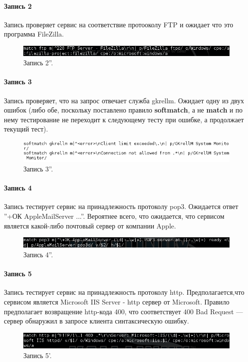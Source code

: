 \documentclass[a4paper, 14pt]{article}				%
\begin{document}
\paragraph{Запись 2\\}
Запись проверяет сервис на соответствие протооколу FTP и ожидает что это программа FileZilla.
\begin{figure}[h!]
\centering
\includegraphics[width=\textwidth]{rsrc/nmap_entry2}
\caption{Запись 2''.}
\end{figure}

\paragraph{Запись 3\\}
Запись проверяет, что на запрос отвечает служба gkrellm. Ожидает одну из двух ошибок (либо обе, поскольку поставлено правило \textbf{softmatch}, а не \textbf{match} и по нему тестирование не переходит к следующему тесту при ошибке, а продолжает текущий тест).
\begin{figure}[h!]
\centering
\includegraphics[width=\textwidth]{rsrc/nmap_entry3}
\caption{Запись 3''.}
\end{figure}

\paragraph{Запись 4\\}
Запись тестирует сервис на принадлежность протоколу pop3. Ожидается ответ ''+ОК AppleMailServer ...''. Вероятнее всего, что ожидается, что сервисом является какой-либо почтовый сервер от компании Apple.
\begin{figure}[h!]
\centering
\includegraphics[width=\textwidth]{rsrc/nmap_entry4}
\caption{Запись 4''.}
\end{figure}

\paragraph{Запись 5\\}
Запись тестирует сервис на принадлежность протоколу http. Предполагается,что сервисом является Microsoft IIS Server - http сервер от Microsoft. Правило предполагает возвращение http-кода 400, что соответствует 400 Bad Request — сервер обнаружил в запросе клиента синтаксическую ошибку.
\begin{figure}[h!]
\centering
\includegraphics[width=\textwidth]{rsrc/nmap_entry5}
\caption{Запись 5'.}
\end{figure}
\end{document}
